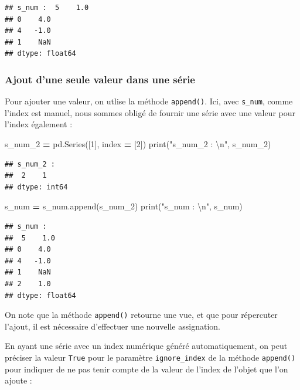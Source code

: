 \documentclass[12pt,]{book}
\newenvironment{Shaded}{\begin{snugshade}}{\end{snugshade}}
\newcommand{\DecValTok}[1]{\textcolor[rgb]{0.00,0.00,0.81}{#1}}
\newcommand{\CharTok}[1]{\textcolor[rgb]{0.31,0.60,0.02}{#1}}
\newcommand{\StringTok}[1]{\textcolor[rgb]{0.31,0.60,0.02}{#1}}
\newcommand{\OperatorTok}[1]{\textcolor[rgb]{0.81,0.36,0.00}{\textbf{#1}}}
\newcommand{\BuiltInTok}[1]{#1}
\newcommand{\NormalTok}[1]{#1}
\numberwithin{equation}{section}
\numberwithin{countremarque}{section}
\begin{document}
\begin{lstlisting}
## s_num :  5    1.0
## 0    4.0
## 4   -1.0
## 1    NaN
## dtype: float64
\end{lstlisting}

\subsubsection{Ajout d'une seule valeur dans une
série}\label{ajout-dune-seule-valeur-dans-une-serie}

Pour ajouter une valeur, on utlise la méthode \texttt{append()}. Ici,
avec \texttt{s\_num}, comme l'index est manuel, nous sommes obligé de
fournir une série avec une valeur pour l'index également :

\begin{Shaded}
\begin{Highlighting}[]
\NormalTok{s_num_2 }\OperatorTok{=}\NormalTok{ pd.Series([}\DecValTok{1}\NormalTok{], index }\OperatorTok{=}\NormalTok{ [}\DecValTok{2}\NormalTok{])}
\BuiltInTok{print}\NormalTok{(}\StringTok{"s_num_2 : }\CharTok{\textbackslash{}n}\StringTok{"}\NormalTok{, s_num_2)}
\end{Highlighting}
\end{Shaded}

\begin{lstlisting}
## s_num_2 : 
##  2    1
## dtype: int64
\end{lstlisting}

\begin{Shaded}
\begin{Highlighting}[]
\NormalTok{s_num }\OperatorTok{=}\NormalTok{ s_num.append(s_num_2)}
\BuiltInTok{print}\NormalTok{(}\StringTok{"s_num : }\CharTok{\textbackslash{}n}\StringTok{"}\NormalTok{, s_num)}
\end{Highlighting}
\end{Shaded}

\begin{lstlisting}
## s_num : 
##  5    1.0
## 0    4.0
## 4   -1.0
## 1    NaN
## 2    1.0
## dtype: float64
\end{lstlisting}

On note que la méthode \texttt{append()} retourne une vue, et que pour
répercuter l'ajout, il est nécessaire d'effectuer une nouvelle
assignation.

En ayant une série avec un index numérique généré automatiquement, on
peut préciser la valeur \texttt{True} pour le paramètre
\texttt{ignore\_index} de la méthode \texttt{append()} pour indiquer de
ne pas tenir compte de la valeur de l'index de l'objet que l'on ajoute :
\end{document}
